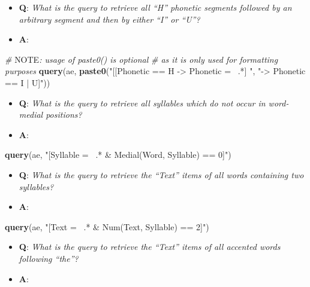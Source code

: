 \documentclass[]{book}
\newenvironment{Shaded}{\begin{snugshade}}{\end{snugshade}}
\newcommand{\AlertTok}[1]{\textcolor[rgb]{0.94,0.16,0.16}{#1}}
\newcommand{\CommentTok}[1]{\textcolor[rgb]{0.56,0.35,0.01}{\textit{#1}}}
\newcommand{\KeywordTok}[1]{\textcolor[rgb]{0.13,0.29,0.53}{\textbf{#1}}}
\newcommand{\NormalTok}[1]{#1}
\newcommand{\StringTok}[1]{\textcolor[rgb]{0.31,0.60,0.02}{#1}}
\providecommand{\tightlist}{%
  \setlength{\itemsep}{0pt}\setlength{\parskip}{0pt}}
\begin{document}
\begin{itemize}
\tightlist
\item
  \textbf{Q}: \emph{What is the query to retrieve all ``H'' phonetic segments followed by an arbitrary segment and then by either ``I'' or ``U''?}
\item
  \textbf{A}:
\end{itemize}

\begin{Shaded}
\begin{Highlighting}[]
\CommentTok{# }\AlertTok{NOTE}\CommentTok{: usage of paste0() is optional}
\CommentTok{# as it is only used for formatting purposes}
\KeywordTok{query}\NormalTok{(ae, }\KeywordTok{paste0}\NormalTok{(}\StringTok{"[[Phonetic == H -> Phonetic =~ .*] "}\NormalTok{,}
                 \StringTok{"-> Phonetic == I | U]"}\NormalTok{))}
\end{Highlighting}
\end{Shaded}

\begin{itemize}
\tightlist
\item
  \textbf{Q}: \emph{What is the query to retrieve all syllables which do not occur in word-medial positions?}
\item
  \textbf{A}:
\end{itemize}

\begin{Shaded}
\begin{Highlighting}[]
\KeywordTok{query}\NormalTok{(ae, }\StringTok{"[Syllable =~ .* & Medial(Word, Syllable) == 0]"}\NormalTok{)}
\end{Highlighting}
\end{Shaded}

\begin{itemize}
\tightlist
\item
  \textbf{Q}: \emph{What is the query to retrieve the ``Text'' items of all words containing two syllables?}
\item
  \textbf{A}:
\end{itemize}

\begin{Shaded}
\begin{Highlighting}[]
\KeywordTok{query}\NormalTok{(ae, }\StringTok{"[Text =~ .* & Num(Text, Syllable) == 2]"}\NormalTok{)}
\end{Highlighting}
\end{Shaded}

\begin{itemize}
\tightlist
\item
  \textbf{Q}: \emph{What is the query to retrieve the ``Text'' items of all accented words following ``the''?}
\item
  \textbf{A}:
\end{itemize}
\end{document}
